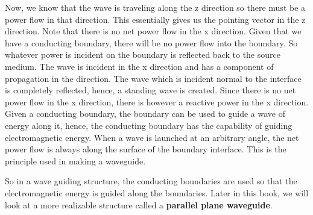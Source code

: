 Now, we know that the wave is traveling along the z direction so there must be a power flow in that direction. This essentially gives us the pointing vector in the z direction. Note that there is no net power flow in the x direction. Given that we have a conducting boundary, there will be no power flow into the boundary. So whatever power is incident on the boundary is reflected back to the source medium. The wave is incident in the x direction and has a component of propagation in the direction. The wave which is incident normal to the interface is completely reflected, hence, a standing wave is created. Since there is no net power flow in the x direction, there is however a reactive power in the x direction. Given a conducting boundary, the boundary can be used to guide a wave of energy along it, hence, the conducting boundary has the capability of guiding electromagnetic energy. When a wave is launched at an arbitrary angle, the net power flow is always along the surface of the boundary interface. This is the principle used in making a waveguide. 

So in a wave guiding structure, the conducting boundaries are used so that the electromagnetic energy is guided along the boundaries. Later in this book, we will look at a more realizable structure called a \textbf{parallel plane waveguide}.